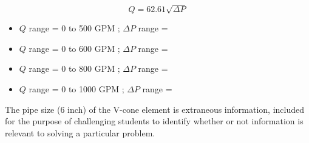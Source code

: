 





$$Q = 62.61 \sqrt{\Delta P}$$

\begin{itemize}
\item{} $Q$ range = 0 to 500 GPM ; $\Delta P$ range = 
\item{} $Q$ range = 0 to 600 GPM ; $\Delta P$ range = 
\item{} $Q$ range = 0 to 800 GPM ; $\Delta P$ range = 
\item{} $Q$ range = 0 to 1000 GPM ; $\Delta P$ range = 
\end{itemize}

\vskip 10pt

The pipe size (6 inch) of the V-cone element is extraneous information, included for the purpose of challenging students to identify whether or not information is relevant to solving a particular problem.





